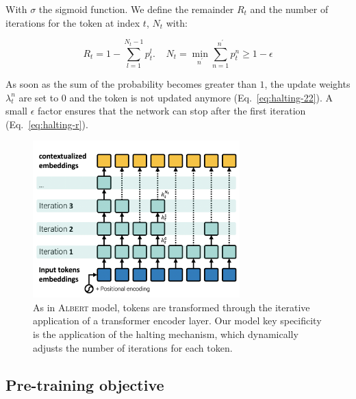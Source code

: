 With $\sigma$ the sigmoid function. We define the remainder $R_t$ and the number of iterations for the token at index $t$, $N_t$ with:

\begin{equation}
R_t=1-\sum_{l=1}^{N_t-1}p^l_t. ~~~~~N_{t}=\min_{n^{\prime}}\sum_{n=1}^{n^{\prime}}p^n_t \geq 1-\epsilon \label{eq:halting-r}
\end{equation}

As soon as the sum of the probability becomes greater than $1$, the update weights $\lambda^n_t$ are set to 0 and the token is not updated anymore (Eq.~\ref{eq:halting-22}). A small $\epsilon$ factor ensures that the network can stop after the first iteration (Eq.~\ref{eq:halting-r}).

\begin{figure}[!htb]
\begin{center}
\includegraphics[width=8cm]{images/model-3.png}
\end{center}
\caption{As in \textsc{Albert}  model, tokens are transformed through the iterative application of a transformer encoder layer. Our model key specificity is the application of the halting mechanism, which dynamically adjusts the number of iterations for each token.
}
\end{figure}

\subsection{Pre-training objective}

